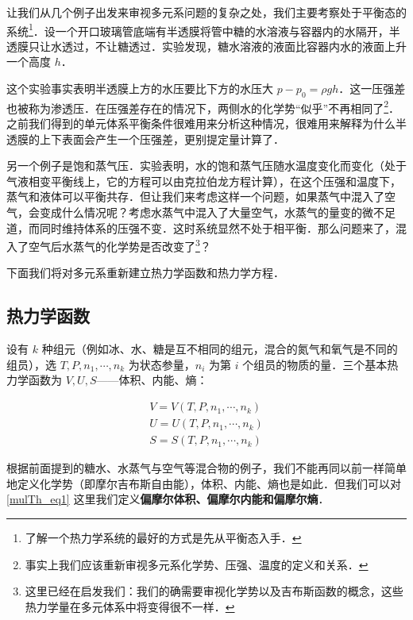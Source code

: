 
让我们从几个例子出发来审视多元系问题的复杂之处，我们主要考察处于平衡态的系统\footnote{了解一个热力学系统的最好的方式是先从平衡态入手．}．设一个开口玻璃管底端有半透膜将管中糖的水溶液与容器内的水隔开，半透膜只让水透过，不让糖透过．实验发现，糖水溶液的液面比容器内水的液面上升一个高度 $h$．

这个实验事实表明半透膜上方的水压要比下方的水压大 $p-p_0=\rho g h$．这一压强差也被称为渗透压．在压强差存在的情况下，两侧水的化学势“似乎”不再相同了\footnote{事实上我们应该重新审视多元系化学势、压强、温度的定义和关系．}．之前我们得到的单元体系平衡条件很难用来分析这种情况，很难用来解释为什么半透膜的上下表面会产生一个压强差，更别提定量计算了．

另一个例子是饱和蒸气压．实验表明，水的饱和蒸气压随水温度变化而变化（处于气液相变平衡线上，它的方程可以由克拉伯龙方程计算），在这个压强和温度下，蒸气和液体可以平衡共存．但让我们来考虑这样一个问题，如果蒸气中混入了空气，会变成什么情况呢？考虑水蒸气中混入了大量空气，水蒸气的量变的微不足道，而同时维持体系的压强不变．这时系统显然不处于相平衡．那么问题来了，混入了空气后水蒸气的化学势是否改变了\footnote{这里已经在启发我们：我们的确需要审视化学势以及吉布斯函数的概念，这些热力学量在多元体系中将变得很不一样．}？

下面我们将对多元系重新建立热力学函数和热力学方程．

\subsection{热力学函数}

设有 $k$ 种组元（例如冰、水、糖是互不相同的组元，混合的氮气和氧气是不同的组员），选 $T,P,n_1,\cdots,n_k$ 为状态参量，$n_i$ 为第 $i$ 个组员的物质的量．三个基本热力学函数为 $V,U,S$——体积、内能、熵：

\begin{equation}\label{mulTh_eq1}
\begin{aligned}
V=V(T,P,n_1,\cdots,n_k)\\
U=U(T,P,n_1,\cdots,n_k)\\
S=S(T,P,n_1,\cdots,n_k)
\end{aligned}
\end{equation}

根据前面提到的糖水、水蒸气与空气等混合物的例子，我们不能再同以前一样简单地定义化学势（即摩尔吉布斯自由能），体积、内能、熵也是如此．但我们可以对\autoref{mulTh_eq1}  这里我们定义\textbf{偏摩尔体积、偏摩尔内能和偏摩尔熵}．

